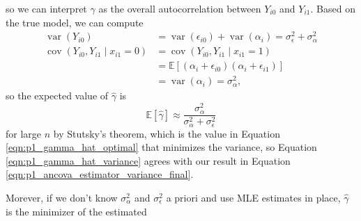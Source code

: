 \documentclass[letterpaper,11pt]{article}
\begin{document}
\begin{enumerate}
\begin{enumerate}
\begin{description}
      so we can interpret $\gamma$ as the overall autocorrelation between
      $Y_{i0}$ and $Y_{i1}$. Based on the true model, we can compute
      \begin{align*}
        \operatorname{var}\left(Y_{i0}\right)
        &= \operatorname{var}\left(\epsilon_{i0}\right) + \operatorname{var}\left(\alpha_i\right)
        = \sigma_\epsilon^2 + \sigma_\alpha^2 \\
        \operatorname{cov}\left(Y_{i0}, Y_{i1} \mid x_{i1} = 0\right) &=
        \operatorname{cov}\left(Y_{i0}, Y_{i1} \mid x_{i1} = 1\right) \\
        &= \mathbb{E}\left[\left(\alpha_i + \epsilon_{i0}\right)\left(
          \alpha_i + \epsilon_{i1}
          \right)\right] \\
        &= \operatorname{var}\left(\alpha_i\right) = \sigma^2_\alpha,
      \end{align*}
      so the expected value of $\hat{\gamma}$ is
      \begin{equation}
        \mathbb{E}\left[\hat{\gamma}\right] \approx \frac{\sigma^2_\alpha}{\sigma^2_\alpha + \sigma^2_\epsilon}
        \label{eqn:p1_gamma_hat_expected}     
      \end{equation}
      for large $n$ by Stutsky's theorem, which is the value in Equation
      \ref{eqn:p1_gamma_hat_optimal} that minimizes the variance, so Equation
      \ref{eqn:p1_gamma_hat_variance} agrees with our result in Equation
      \ref{eqn:p1_ancova_estimator_variance_final}.

      Morever, if we don't know $\sigma_\alpha^2$ and $\sigma_\epsilon^2$ a
      priori and use MLE estimates in place, $\hat{\gamma}$ is the minimizer of
      the estimated
    \end{description}      
  \end{enumerate}
\end{enumerate}
\end{document}
